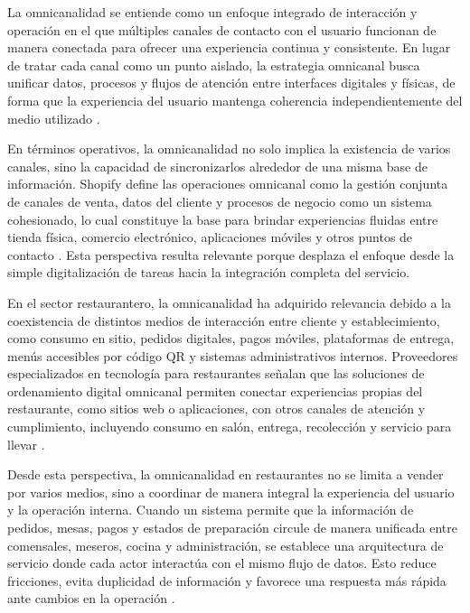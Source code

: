 \documentclass[12pt]{report}
\begin{document}
La omnicanalidad se entiende como un enfoque integrado de interacción y operación en el que múltiples canales de contacto con el usuario funcionan de manera conectada para ofrecer una experiencia continua y consistente. En lugar de tratar cada canal como un punto aislado, la estrategia omnicanal busca unificar datos, procesos y flujos de atención entre interfaces digitales y físicas, de forma que la experiencia del usuario mantenga coherencia independientemente del medio utilizado \cite{shopify_omnichannel_experience_2025,shopify_omnichannel_operations_2025}.

En términos operativos, la omnicanalidad no solo implica la existencia de varios canales, sino la capacidad de sincronizarlos alrededor de una misma base de información. Shopify define las operaciones omnicanal como la gestión conjunta de canales de venta, datos del cliente y procesos de negocio como un sistema cohesionado, lo cual constituye la base para brindar experiencias fluidas entre tienda física, comercio electrónico, aplicaciones móviles y otros puntos de contacto \cite{shopify_omnichannel_operations_2025}. Esta perspectiva resulta relevante porque desplaza el enfoque desde la simple digitalización de tareas hacia la integración completa del servicio.

En el sector restaurantero, la omnicanalidad ha adquirido relevancia debido a la coexistencia de distintos medios de interacción entre cliente y establecimiento, como consumo en sitio, pedidos digitales, pagos móviles, plataformas de entrega, menús accesibles por código QR y sistemas administrativos internos. Proveedores especializados en tecnología para restaurantes señalan que las soluciones de ordenamiento digital omnicanal permiten conectar experiencias propias del restaurante, como sitios web o aplicaciones, con otros canales de atención y cumplimiento, incluyendo consumo en salón, entrega, recolección y servicio para llevar \cite{deliverect_digital_ordering_2026,deliverect_omnichannel_restaurant_2024}.

Desde esta perspectiva, la omnicanalidad en restaurantes no se limita a vender por varios medios, sino a coordinar de manera integral la experiencia del usuario y la operación interna. Cuando un sistema permite que la información de pedidos, mesas, pagos y estados de preparación circule de manera unificada entre comensales, meseros, cocina y administración, se establece una arquitectura de servicio donde cada actor interactúa con el mismo flujo de datos. Esto reduce fricciones, evita duplicidad de información y favorece una respuesta más rápida ante cambios en la operación \cite{deliverect_digital_ordering_2026,shopify_omnichannel_experience_2025}.
\end{document}
